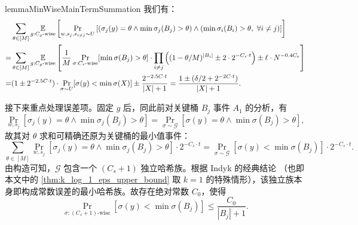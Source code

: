 \begin{restatable}{lemma}{MinWiseMainTermSummation}\label{lem:minwise_main_term_summation}
    我们有：
    \begin{align*}
          & \sum_{\theta \in [M]} \E_{g : \text{$C_g$-wise}} \left[ \Pr_{w, s_j, s_{i \ne j} \sim U}\left[ (\sigma_j(y) = \theta \wedge \min \sigma_j(B_j) > \theta) \wedge (\min \sigma_i(B_i) > \theta,\ \forall i \ne j) \right]  \right] \\
        = & \sum_{\theta \in [M]} \E_{g : \text{$C_g$-wise}} \left[ \frac{1}{M} \Pr_{\sigma : C_s\text{-wise}}[\min \sigma(B_j) > \theta] \cdot \prod_{i \ne j} \left( (1 - \theta / M)^{|B_i|} \pm 2 \cdot 2^{-C_s \cdot t} \right) \pm \ell \cdot N^{-0.4 C_e} \right] \\
        = & (1 \pm 2^{-2.5 C \cdot t}) \cdot \Pr_{\sigma \sim U}[\sigma(y) < \min \sigma(X)] \pm \frac{2^{-2.5 C \cdot t}}{|X| + 1} = \frac{1 \pm (\delta / 2 + 2^{-2 C \cdot t})}{|X| + 1}.
    \end{align*}
\end{restatable}

接下来重点处理误差项。固定 $g$ 后，同此前对关键桶 $B_j$ 事件 $A_1$ 的分析，有
$$
\Pr_{w, s_j}\left[ \sigma_j(y) = \theta \wedge \min \sigma_j(B_j) > \theta \right] = \Pr_{\sigma \sim \mathcal{G}}[\sigma(y) = \theta \wedge \min \sigma(B_j) > \theta],
$$
故其对 $\theta$ 求和可精确还原为关键桶的最小值事件：
$$
\sum_{\theta \in [M]} \Pr_{w, s_j}\left[ \sigma_j(y) = \theta \wedge \min \sigma_j(B_j) > \theta \right] \cdot 2^{-C_s \cdot t} = \Pr_{\sigma \sim \mathcal{G}}[\sigma(y) < \min \sigma(B_j)] \cdot 2^{-C_s \cdot t}.
$$
由构造可知，$\mathcal{G}$ 包含一个 $(C_s + 1)$ 独立哈希族。根据 Indyk 的经典结论 \cite{minwise_Indyk}（也即本文中的 \cref{thm:k_log_1_eps_upper_bound} 取 $k = 1$ 的特殊情形），该独立族本身即构成常数误差的最小哈希族。故存在绝对常数 $C_0$，使得
$$
\Pr_{\sigma : (C_s + 1)\text{-wise}}[\sigma(y) < \min \sigma(B_j)] \le \frac{C_0}{|B_j| + 1}.
$$

